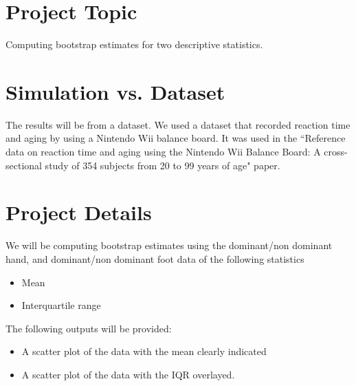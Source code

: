 \documentclass{article}
\begin{document}
    \begin{normalsize}    
    	\section{Project Topic}
        Computing bootstrap estimates for two descriptive statistics. \\

        \section{Simulation vs. Dataset}
        The results will be from a dataset. We used a dataset that recorded reaction time and aging by using a Nintendo Wii balance board. It was used in the ``Reference data on reaction time and aging using the Nintendo Wii Balance Board: A cross-sectional study of 354 subjects from 20 to 99 years of age" paper.
        
        \section{Project Details}
        We will be computing bootstrap estimates using the dominant/non dominant hand, and dominant/non dominant foot data of the following statistics
        \begin{itemize}
            \item Mean
            \item Interquartile range
        \end{itemize}
        The following outputs will be provided:
        \begin{itemize}
            \item A scatter plot of the data with the mean clearly indicated
            \item A scatter plot of the data with the IQR overlayed.
        \end{itemize}
        

\end{normalsize}
\end{document}
